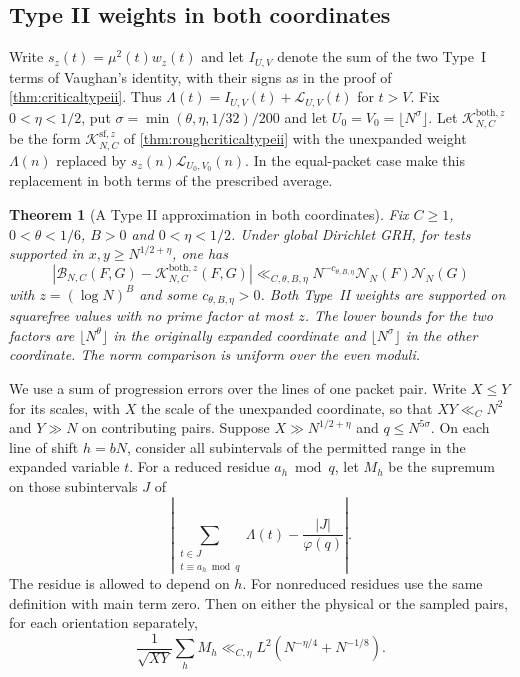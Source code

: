 \documentclass[11pt,a4paper]{article}
\numberwithin{equation}{section}
\newtheorem{theorem}{Theorem}[section]
\newcommand{\NN}{\mathcal N_N}
\begin{document}
\subsection{Type II weights in both coordinates}

Write $s_z(t)=\mu^2(t)w_z(t)$ and let $I_{U,V}$ denote the
sum of the two Type~I terms of Vaughan's identity, with their
signs as in the proof of \cref{thm:criticaltypeii}. Thus
$\Lambda(t)=I_{U,V}(t)+\mathcal L_{U,V}(t)$ for $t>V$.
Fix $0<\eta<1/2$, put $\sigma=\min(\theta,\eta,1/32)/200$
and let $U_0=V_0=\lfloor N^\sigma\rfloor$.
Let $\mathcal K^{\mathrm{both},z}_{N,C}$ be the form
$\mathcal K^{\mathrm{sf},z}_{N,C}$ of
\cref{thm:roughcriticaltypeii} with the unexpanded weight
$\Lambda(n)$ replaced by $s_z(n)\mathcal L_{U_0,V_0}(n)$.
In the equal-packet case make this replacement in both
terms of the prescribed average.

\begin{theorem}[A Type II approximation in both coordinates]
\label{thm:doublecriticaltypeii}
Fix $C\ge1$, $0<\theta<1/6$, $B>0$ and $0<\eta<1/2$.
Under global Dirichlet GRH, for tests supported in
$x,y\ge N^{1/2+\eta}$, one has
\begin{equation}
 \left|\mathcal B_{N,C}(F,G)
       -\mathcal K^{\mathrm{both},z}_{N,C}(F,G)\right|
  \ll_{C,\theta,B,\eta} N^{-c_{\theta,B,\eta}}\NN(F)\NN(G)
  \label{eq:doublecriticaltypeii}
\end{equation}
with $z=(\log N)^B$ and some $c_{\theta,B,\eta}>0$.
Both Type~II weights are supported on squarefree values with
no prime factor at most $z$. The lower bounds for the two
factors are $\lfloor N^\theta\rfloor$ in the originally
expanded coordinate and $\lfloor N^\sigma\rfloor$ in the
other coordinate. The norm comparison is uniform over the
even moduli.
\end{theorem}

We use a sum of progression errors over the lines of
one packet pair. Write $X\le Y$ for its scales, with $X$
the scale of the unexpanded coordinate, so that
$XY\ll_C N^2$ and $Y\gg N$ on contributing pairs.
Suppose $X\gg N^{1/2+\eta}$ and $q\le N^{5\sigma}$.
On each line of shift $h=bN$, consider all subintervals
of the permitted range in the expanded variable $t$.
For a reduced residue $a_h\bmod q$, let $M_h$ be the
supremum on those subintervals $J$ of
\[
 \left|\sum_{\substack{t\in J\\t\equiv a_h\bmod q}}\Lambda(t)
                               -\frac{|J|}{\varphi(q)}\right|.
\]
The residue is allowed to depend on $h$. For nonreduced
residues use the same definition with main term zero.
Then on either the physical or the sampled pairs, for
each orientation separately,
\begin{equation}
 \frac1{\sqrt{XY}}\sum_h M_h
       \ll_{C,\eta} L^2(N^{-\eta/4}+N^{-1/8}).
 \label{eq:sampledshortprogressions}
\end{equation}
\end{document}
